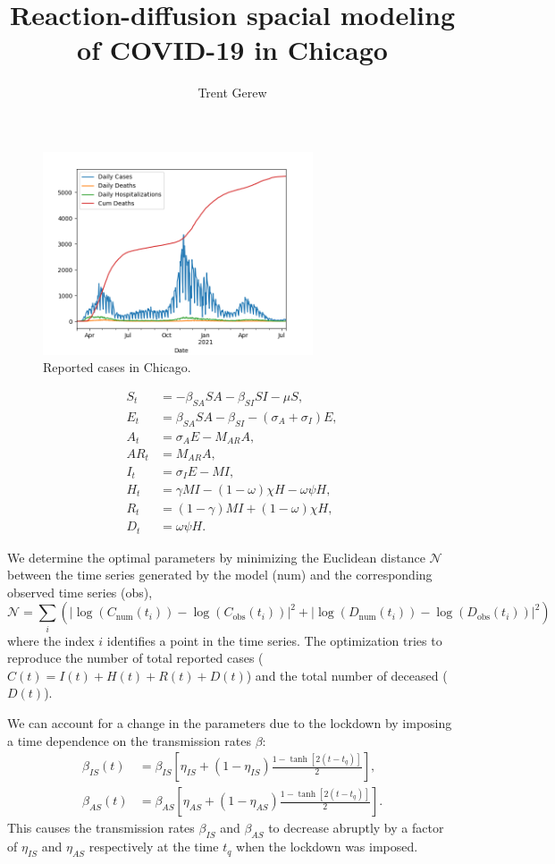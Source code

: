 \documentclass[10pt,letterpaper,final]{article}
\author{Trent Gerew}
\title{Reaction-diffusion spacial modeling of COVID-19 in Chicago}
\newcommand{\N}{\mathcal{N}}
\newcommand{\num}{\text{num}}
\newcommand{\obs}{\text{obs}}
\begin{document}
	
	\maketitle
	
	\begin{figure}[h]
		\centering
		\includegraphics[width=8cm]{series_plot}
		\caption{Reported cases in Chicago.}
		\label{fig:series_plot}
	\end{figure}
	
	\begin{align}
		S_t &= - \beta_{SA} SA - \beta_{SI} SI - \mu S, \\
		E_t &= \beta_{SA} SA - \beta_{SI} - (\sigma_A + \sigma_I) E, \\
		A_t &= \sigma_A E - M_{AR} A, \\
		AR_t &= M_{AR} A, \\
		I_t &= \sigma_I E - MI, \\
		H_t &= \gamma M I - (1 - \omega) \chi H - \omega \psi H, \\
		R_t &= (1 - \gamma) M I + (1 - \omega) \chi H, \\
		D_t &= \omega \psi H.
	\end{align}
	
	We determine the optimal parameters by minimizing the Euclidean distance $\N$ between the time series generated by the model (num) and the corresponding observed time series (obs),
	\begin{equation}
		\N = \sum_i \left( \left| \log(C_{\num}(t_i)) - \log(C_{\obs}(t_i)) \right|^2
		+ \left| \log(D_{\num}(t_i)) - \log(D_{\obs}(t_i)) \right|^2 \right)
	\end{equation}
	where the index $i$ identifies a point in the time series.
	The optimization tries to reproduce the number of total reported cases ($C(t) = I(t) + H(t) + R(t) + D(t)$) and the total number of deceased ($D(t)$).
	
	We can account for a change in the parameters due to the lockdown by imposing a time dependence on the transmission rates $\beta$:
	\begin{align}
		\beta_{IS} (t) &= \beta_{IS} \left[ \eta_{IS} + (1 - \eta_{IS}) \frac{1 - \tanh[2(t - t_q)]}{2} \right], \\
		\beta_{AS} (t) &= \beta_{AS} \left[ \eta_{AS} + (1 - \eta_{AS}) \frac{1 - \tanh[2(t - t_q)]}{2} \right].
	\end{align}
	This causes the transmission rates $\beta_{IS}$ and $\beta_{AS}$ to decrease abruptly by a factor of $\eta_{IS}$ and $\eta_{AS}$ respectively at the time $t_q$ when the lockdown was imposed. \cite{Wang_2020}
	
\end{document}
